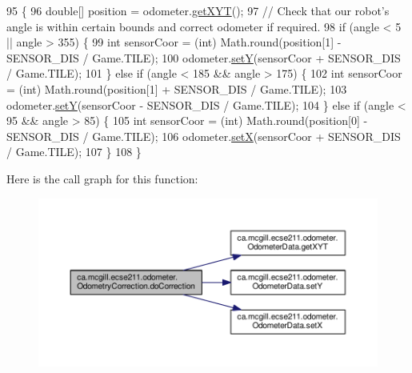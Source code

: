 \begin{DoxyCode}
95                                          \{
96     \textcolor{keywordtype}{double}[] position = odometer.\hyperlink{classca_1_1mcgill_1_1ecse211_1_1odometer_1_1_odometer_data_a8f40f0264c68f0cbed4fff1723ae7863}{getXYT}();
97     \textcolor{comment}{// Check that our robot's angle is within certain bounds and correct odometer if required.}
98     \textcolor{keywordflow}{if} (angle < 5 || angle > 355) \{
99       \textcolor{keywordtype}{int} sensorCoor = (int) Math.round(position[1] - SENSOR\_DIS / Game.TILE);
100       odometer.\hyperlink{classca_1_1mcgill_1_1ecse211_1_1odometer_1_1_odometer_data_a82986438cd462e66520bc62bb4bd2b75}{setY}(sensorCoor + SENSOR\_DIS / Game.TILE);
101     \} \textcolor{keywordflow}{else} \textcolor{keywordflow}{if} (angle < 185 && angle > 175) \{
102       \textcolor{keywordtype}{int} sensorCoor = (int) Math.round(position[1] + SENSOR\_DIS / Game.TILE);
103       odometer.\hyperlink{classca_1_1mcgill_1_1ecse211_1_1odometer_1_1_odometer_data_a82986438cd462e66520bc62bb4bd2b75}{setY}(sensorCoor - SENSOR\_DIS / Game.TILE);
104     \} \textcolor{keywordflow}{else} \textcolor{keywordflow}{if} (angle < 95 && angle > 85) \{
105       \textcolor{keywordtype}{int} sensorCoor = (int) Math.round(position[0] - SENSOR\_DIS / Game.TILE);
106       odometer.\hyperlink{classca_1_1mcgill_1_1ecse211_1_1odometer_1_1_odometer_data_a2911d7215e47f3064defe016b46bfeef}{setX}(sensorCoor + SENSOR\_DIS / Game.TILE);
107     \}
108   \}
\end{DoxyCode}
Here is the call graph for this function\+:\nopagebreak
\begin{figure}[H]
\begin{center}
\leavevmode
\includegraphics[width=350pt]{classca_1_1mcgill_1_1ecse211_1_1odometer_1_1_odometry_correction_a21a351682dc75060d6a5f15ad4775068_cgraph}
\end{center}
\end{figure}
\mbox{\label{classca_1_1mcgill_1_1ecse211_1_1odometer_1_1_odometry_correction_aad66a7030ac00f3a9cbe7bc33c25acbf}} 
